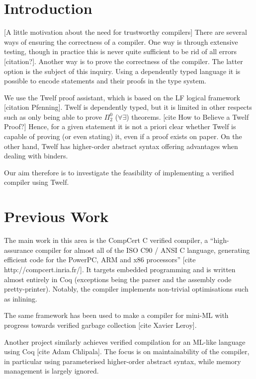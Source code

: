 \section{Introduction}

[A little motivation about the need for trustworthy compilers]
There are several ways of ensuring the correctness of a compiler.
One way is through extensive testing, though in practice this is never quite sufficient to be rid of all errors [citation?].
Another way is to prove the correctness of the compiler.
The latter option is the subject of this inquiry.
Using a dependently typed language it is possible to encode statements and their proofs in the type system.

We use the Twelf proof assistant, which is based on the LF logical framework [citation Pfenning].
Twelf is dependently typed, but it is limited in other respects such as only being able to prove $\Pi_2^0$ ($\forall \exists$) theorems. [cite How to Believe a Twelf Proof?]
Hence, for a given statement it is not a priori clear whether Twelf is capable of proving (or even stating) it, even if a proof exists on paper.
On the other hand, Twelf has higher-order abstract syntax offering advantages when dealing with binders.

Our aim therefore is to investigate the feasibility of implementing a verified compiler using Twelf.


\section{Previous Work}

The main work in this area is the CompCert C verified compiler, a ``high-assurance compiler for almost all of the ISO C90 / ANSI C language, generating efficient code for the PowerPC, ARM and x86 processors'' [cite http://compcert.inria.fr/].
It targets embedded programming and is written almost entirely in Coq (exceptions being the parser and the assembly code pretty-printer).
Notably, the compiler implements non-trivial optimisations such as inlining.

The same framework has been used to make a compiler for mini-ML with progress towards verified garbage collection [cite Xavier Leroy].

Another project similarly achieves verified compilation for an ML-like language using Coq [cite Adam Chlipala].
The focus is on maintainability of the compiler, in particular using parameterised higher-order abstract syntax, while memory management is largely ignored.

